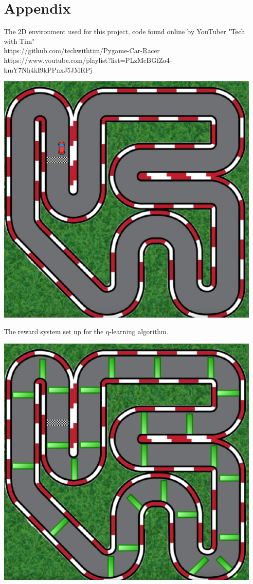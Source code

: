 \section*{Appendix}

The 2D environment used for this project, code found online by YouTuber "Tech with Tim"\\
https://github.com/techwithtim/Pygame-Car-Racer\\
https://www.youtube.com/playlist?list=PLzMcBGfZo4-kmY7Nh4kI9kPPnxJ5JMRPj
\begin{center}
\includegraphics[scale=0.3]{Billeder/environment.png}\\
\end{center}
The reward system set up for the q-learning algorithm.
\begin{center}
\includegraphics[scale=0.3]{Billeder/reward.png}\\
\end{center}
